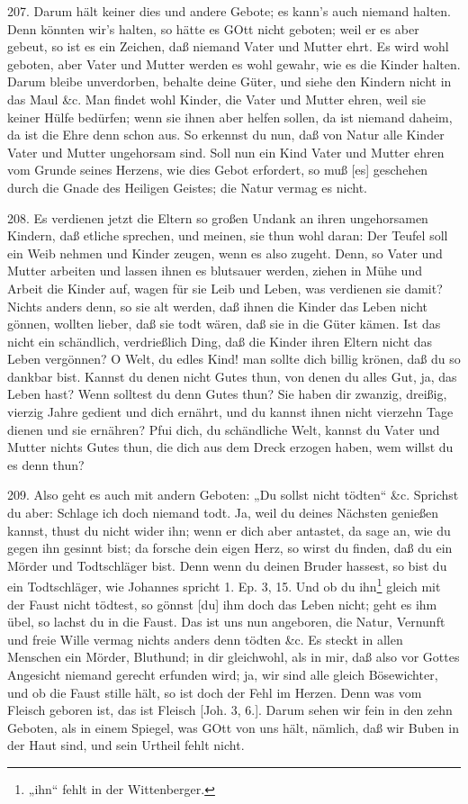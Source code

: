 207. Darum hält keiner dies und andere Gebote; es kann’s auch niemand halten. Denn könnten wir’s halten, so hätte es GOtt nicht geboten; weil er es aber gebeut, so ist es ein Zeichen, daß niemand Vater und Mutter ehrt. Es wird wohl geboten, aber Vater und Mutter werden es wohl gewahr, wie es die Kinder halten. Darum bleibe unverdorben, behalte deine Güter, und siehe den Kindern nicht in das Maul \&c. Man findet wohl Kinder, die Vater und Mutter ehren, weil sie keiner Hülfe bedürfen; wenn sie ihnen aber helfen sollen, da ist niemand daheim, da ist die Ehre denn schon aus. So erkennst du nun, daß von Natur alle Kinder Vater und Mutter ungehorsam sind. Soll nun ein Kind Vater und Mutter ehren vom Grunde seines Herzens, wie dies Gebot erfordert, so muß [es] geschehen durch die Gnade des Heiligen Geistes; die Natur vermag es nicht.

208. Es verdienen jetzt die Eltern so großen Undank an ihren ungehorsamen Kindern, daß etliche sprechen, und meinen, sie thun wohl daran: Der Teufel soll ein Weib nehmen und Kinder zeugen, wenn es also zugeht. Denn, so Vater und Mutter arbeiten und lassen ihnen es blutsauer werden, ziehen in Mühe und Arbeit die Kinder auf, wagen für sie Leib und Leben, was verdienen sie damit? Nichts anders denn, so sie alt werden, daß ihnen die Kinder das Leben nicht gönnen, wollten lieber, daß sie todt wären, daß sie in die Güter kämen. Ist das nicht ein schändlich, verdrießlich Ding, daß die Kinder ihren Eltern nicht das Leben vergönnen? O Welt, du edles Kind! man sollte dich billig krönen, daß du so dankbar bist. Kannst du denen nicht Gutes thun, von denen du alles Gut, ja, das Leben hast? Wenn solltest du denn Gutes thun? Sie haben dir zwanzig, dreißig, vierzig Jahre gedient und dich ernährt, und du kannst ihnen nicht vierzehn Tage dienen und sie ernähren? Pfui dich, du schändliche Welt, kannst du Vater und Mutter nichts Gutes thun, die dich aus dem Dreck erzogen haben, wem willst du es denn thun?

209. Also geht es auch mit andern Geboten: „Du sollst nicht tödten“ \&c. Sprichst du aber: Schlage ich doch niemand todt. Ja, weil du deines Nächsten genießen kannst, thust du nicht wider ihn; wenn er dich aber antastet, da sage an, wie du gegen ihn gesinnt bist; da forsche dein eigen Herz, so wirst du finden, daß du ein Mörder und Todtschläger bist. Denn wenn du deinen Bruder hassest, so bist du ein Todtschläger, wie Johannes spricht 1. Ep. 3, 15. Und ob du ihn\footnote{„ihn“ fehlt in der Wittenberger.} gleich mit der Faust nicht tödtest, so gönnst [du] ihm doch das Leben nicht; geht es ihm übel, so lachst du in die Faust. Das ist uns nun angeboren, die Natur, Vernunft und freie Wille vermag nichts anders denn tödten \&c. Es steckt in allen Menschen ein Mörder, Bluthund; in dir gleichwohl, als in mir, daß also
vor Gottes Angesicht niemand gerecht erfunden wird; ja, wir sind alle gleich Bösewichter, und ob die Faust stille hält, so ist doch der Fehl im Herzen. Denn was vom Fleisch geboren ist, das ist Fleisch [Joh. 3, 6.]. Darum sehen wir fein in den zehn Geboten, als in einem Spiegel, was GOtt von uns hält, nämlich, daß wir Buben in der Haut sind, und sein Urtheil fehlt nicht.

